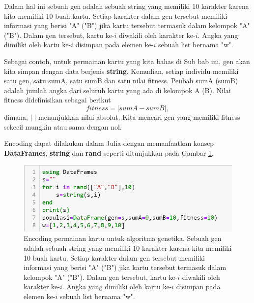 \documentclass[12pt,a4paper]{memoir}
\begin{document}
Dalam hal ini sebuah gen adalah sebuah string yang memiliki 10 karakter karena kita memiliki 10 buah kartu. Setiap karakter dalam gen tersebut memiliki informasi yang berisi "A" ("B") jika kartu tersebut termasuk dalam kelompok "A" ("B"). Dalam gen tersebut, kartu ke-$i$ diwakili oleh karakter ke-$i$. Angka yang dimiliki oleh kartu ke-$i$ disimpan pada elemen ke-$i$ sebuah list bernama "w".

Sebagai contoh, untuk permainan kartu yang kita bahas di Sub bab ini, gen akan kita simpan dengan data berjenis \textbf{string}. Kemudian, setiap individu memiliki satu gen, satu sumA, satu sumB dan satu nilai fitness. Peubah sumA (sumB) adalah jumlah angka dari seluruh kartu yang ada di kelompok  A (B).
Nilai fitness didefinisikan sebagai berikut
\[
fitness=\left\lvert sumA-sumB \right\rvert,
\]
dimana, $\rvert\;\lvert$ menunjukkan nilai absolut. Kita mencari gen yang memiliki fitness sekecil mungkin atau sama dengan nol.

Encoding dapat dilakukan dalam Julia dengan memanfaatkan konsep \textbf{DataFrames}, \textbf{string} dan \textbf{rand} seperti ditunjukkan pada Gambar \ref{fig:ga1}.
\begin{figure}[h]
	\centering
	\includegraphics{images/ga1}
	\caption{Encoding permainan kartu untuk algoritma genetika. Sebuah gen adalah sebuah string yang memiliki 10 karakter karena kita memiliki 10 buah kartu. Setiap karakter dalam gen tersebut memiliki informasi yang berisi "A" ("B") jika kartu tersebut termasuk dalam kelompok "A" ("B"). Dalam gen tersebut, kartu ke-$i$ diwakili oleh karakter ke-$i$. Angka yang dimiliki oleh kartu ke-$i$ disimpan pada elemen ke-$i$ sebuah list bernama "w".}
	\label{fig:ga1}
\end{figure}
\end{document}
